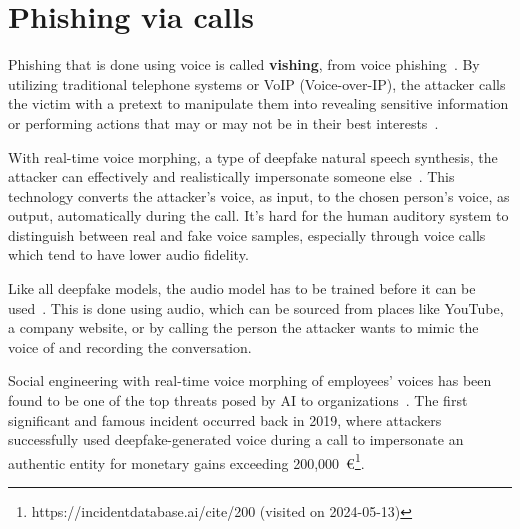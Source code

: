 \section{Phishing via calls}
\begin{comment}
\end{comment}

%
%
Phishing that is done using voice is called \textbf{vishing}, from voice phishing~\citep{doan_BTSE_Audio_Deepfake_Detection_2023}. By utilizing traditional telephone systems or VoIP (Voice-over-IP), the attacker calls the victim with a pretext to manipulate them into revealing sensitive information or performing actions that may or may not be in their best interests~\citep{hadnagy_Social_Engineering_The_Science_2018}.


%
%
With real-time voice morphing, a type of deepfake natural speech synthesis, the attacker can effectively and realistically impersonate someone else~\citep{doan_BTSE_Audio_Deepfake_Detection_2023}. This technology converts the attacker's voice, as input, to the chosen person's voice, as output, automatically during the call. It's hard for the human auditory system to distinguish between real and fake voice samples, especially through voice calls which tend to have lower audio fidelity.



%
%
Like all deepfake models, the audio model has to be trained before it can be used~\citep{doan_BTSE_Audio_Deepfake_Detection_2023}. This is done using audio, which can be sourced from places like YouTube, a company website, or by calling the person the attacker wants to mimic the voice of and recording the conversation.



%
%
Social engineering with real-time voice morphing of employees' voices has been found to be one of the top threats posed by AI to organizations~\citep{mirsky_Threat_Offensive_AI_Organizations_2023}. The first significant and famous incident occurred back in 2019, where attackers successfully used deepfake-generated voice during a call to impersonate an authentic entity for monetary gains exceeding 200,000~€\footnote{https://incidentdatabase.ai/cite/200 (visited on 2024-05-13)}.
